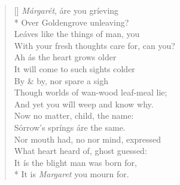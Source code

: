 \documentclass[MAIN]{subfiles}
\begin{document}
\settowidth{\versewidth}{With your fresh thoughts care for, can you?}
\begin{verse}[\versewidth]
\emph{M\'argar\'et}, \'are you gr\'ieving\\* 
Over {\sc Goldengrove} unleaving?\\
Le\'aves like the things of man, you\\
With your fresh thoughts care for, can you?\\
Ah \'as the heart grows older\\
It will come to such sights colder\\
By \& by, nor spare a sigh\\
Though worlds of wan-wood leaf-meal lie;\\
And yet you w\'ill weep and know why.\\
Now no matter, child, the name:\\
S\'orrow's spr\'ings \'are the same.\\
Nor mouth had, no nor mind, expressed\\
What heart heard of, ghost guessed:\\
It \'is the blight man was born for,\\* 
It is \emph{Margaret} you mourn for.
\end{verse}
\end{document}
